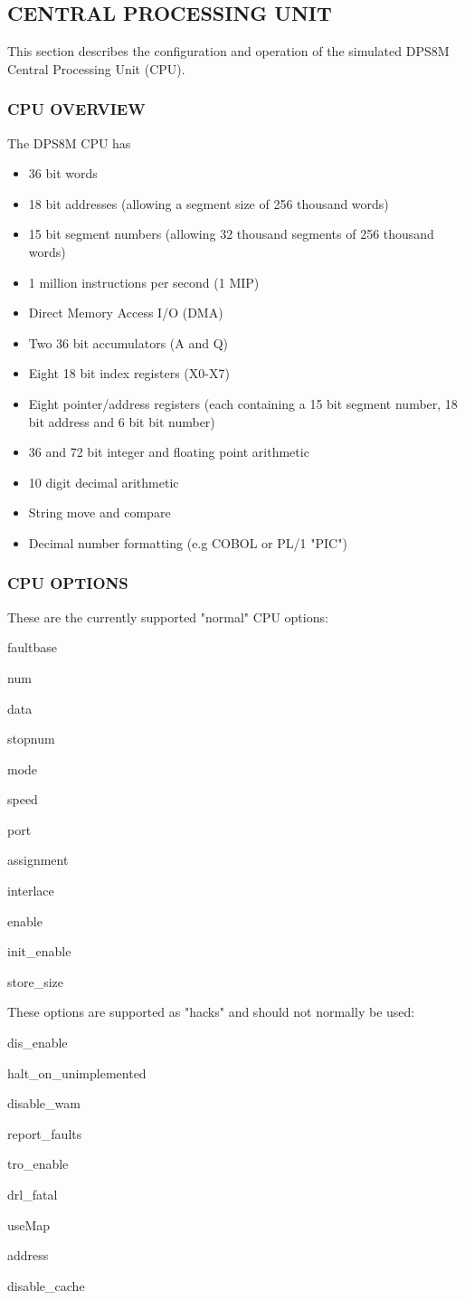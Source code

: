 
\subsection[Central Processing Unit]{CENTRAL PROCESSING UNIT}

This section describes the configuration and operation of the simulated DPS8M Central Processing Unit (CPU).

\subsubsection[CPU Overview]{CPU OVERVIEW}

The DPS8M CPU has
\begin{itemize}
	\item 36 bit words
	\item 18 bit addresses (allowing a segment size of 256 thousand words)
	\item 15 bit segment numbers (allowing 32 thousand segments of 256 thousand words)
	\item 1 million instructions per second (1 MIP)
	\item Direct Memory Access I/O (DMA)
	\item Two 36 bit accumulators (A and Q)
	\item Eight 18 bit index registers (X0-X7)
	\item Eight pointer/address registers (each containing a 15 bit segment number, 18 bit address and 6 bit bit number)
	\item 36 and 72 bit integer and floating point arithmetic
	\item 10 digit decimal arithmetic
	\item String move and compare
	\item Decimal number formatting (e.g COBOL or PL/1 "PIC")
\end{itemize}

\subsubsection[CPU Options]{CPU OPTIONS}

These are the currently supported "normal" CPU options:

faultbase

num

data

stopnum

mode

speed

port

assignment

interlace

enable

init\_enable

store\_size

These options are supported as "hacks" and should not normally be used:

dis\_enable

halt\_on\_unimplemented

disable\_wam

report\_faults

tro\_enable

drl\_fatal

useMap

address

disable\_cache
